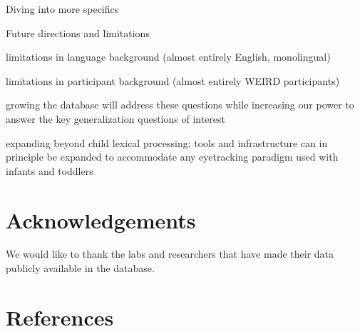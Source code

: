 \documentclass[10pt, letterpaper]{article}
\begin{document}
Diving into more specifics

Future directions and limitations

limitations in language background (almost entirely English,
monolingual)

limitations in participant background (almost entirely WEIRD
participants)

growing the database will address these questions while increasing our
power to answer the key generalization questions of interest

expanding beyond child lexical processing: tools and infrastructure can
in principle be expanded to accommodate any eyetracking paradigm used
with infants and toddlers

\hypertarget{acknowledgements}{%
\section{Acknowledgements}\label{acknowledgements}}

We would like to thank the labs and researchers that have made their
data publicly available in the database.

\hypertarget{references}{%
\section{References}\label{references}}

\setlength{\parindent}{-0.1in}
\setlength{\leftskip}{0.125in}

\noindent
\end{document}

